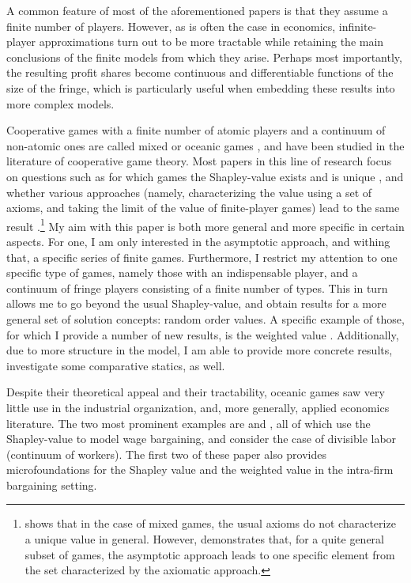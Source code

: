 \documentclass[a4paper]{article}
\begin{document}
A common feature of most of the aforementioned papers is that they assume a finite number of players.
However, as is often the case in economics, infinite-player approximations turn out to be more tractable while retaining the main conclusions of the finite models from which they arise.
Perhaps most importantly, the resulting profit shares become continuous and differentiable functions of the size of the fringe, which is particularly useful when embedding these results into more complex models.

Cooperative games with a finite number of atomic players and a continuum of non-atomic ones are called mixed or oceanic games \parencite{milnor1978values}, and have been studied in the literature of cooperative game theory.
Most papers in this line of research focus on questions such as for which games the Shapley-value exists and is unique \parencite{hart1973values}, and whether various approaches (namely, characterizing the value using a set of axioms, and taking the limit of the value of finite-player games) lead to the same result \parencite{fogelman1980asymptotic}.\footnote{
    \textcite{hart1973values} shows that in the case of mixed games, the usual axioms do not characterize a unique value in general.
    However, \textcite{fogelman1980asymptotic} demonstrates that, for a quite general subset of games, the asymptotic approach leads to one specific element from the set characterized by the axiomatic approach. 
}
My aim with this paper is both more general and more specific in certain aspects.
For one, I am only interested in the asymptotic approach, and withing that, a specific series of finite games.
Furthermore, I restrict my attention to one specific type of games, namely those with an indispensable player, and a continuum of fringe players consisting of a finite number of types.
This in turn allows me to go beyond the usual Shapley-value, and obtain results for a more general set of solution concepts: random order values.
A specific example of those, for which I provide a number of new results, is the weighted value \parencite{shapley1953additive}.
Additionally, due to more structure in the model, I am able to provide more concrete results, investigate some comparative statics, as well.

Despite their theoretical appeal and their tractability, oceanic games saw very little use in the industrial organization, and, more generally, applied economics literature.
The two most prominent examples are \textcite{stole1996intra, stole1996organizational} and \textcite{levy1997individual}, all of which use the Shapley-value to model wage bargaining, and consider the case of divisible labor (continuum of workers).
The first two of these paper also provides microfoundations for the Shapley value and the weighted value in the intra-firm bargaining setting.
\end{document}
